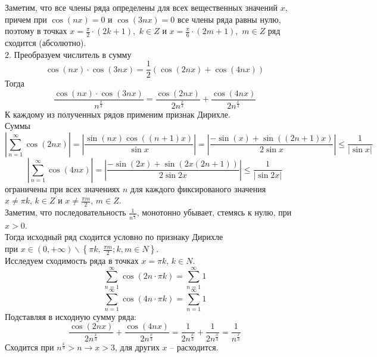 \documentclass[a5paper, 10pt]{article}
\theoremstyle{definition}
\theoremstyle{plain}
\theoremstyle{remark}
\begin{document}
Заметим, что все члены ряда определены для всех вещественных значений $x$, причем при $\cos(nx) = 0$  и $\cos(3 nx) = 0$  все члены ряда равны нулю, поэтому \hypertarget{pdf}{в точках}  $x = \frac{\pi}{2} \cdot (2k + 1), \,\, k \in Z$  и $x = \frac{\pi}{6} \cdot (2m + 1), \,\, m \in Z$ ряд сходится (абсолютно).\\
2. Преобразуем числитель в сумму
\begin{equation*}
\cos( nx) \cdot \cos (3nx) = \frac{1}{2}\left( \cos(2nx) + \cos(4nx) \right)
\end{equation*}
Тогда
\begin{equation*}
\frac{\cos( nx) \cdot \cos (3nx) }{n^{\frac{x}{3}}} = \frac{\cos( 2nx) }{2n^{\frac{x}{3}}}+\frac{ \cos (4nx) }{2n^{\frac{x}{3}}}
\end{equation*}
К каждому из полученных рядов применим признак Дирихле.\\
Суммы 
\begin{equation*}
\left| \sum \limits_{n = 1}^{\infty} \cos( 2nx) \right| = \left| \frac{\sin (n x) \cos((n+1)x)}{\sin x} \right| =
 \left| \frac{-\sin (x) +  \sin((2n+1)x)}{2\sin x} \right| \leq \frac{1}{ \left|\sin x\right|}
\end{equation*}
\begin{equation*}
\left| \sum \limits_{n = 1}^{\infty} \cos( 4nx) \right| = \left| \frac{-\sin (2x) +  \sin(2x(2n+1))}{2\sin 2x} \right| \leq \frac{1}{ \left|\sin 2x\right|}
\end{equation*}
ограничены при всех значениях $n$ для каждого фиксированого значения $x \neq \pi k, \, k \in Z$ и $x \neq \frac{\pi m}{2}, \, m \in Z$.\\
Заметим, что  последовательность $\frac{1}{n^{\frac{x}{3}}}$, монотонно убывает, стемясь к нулю, при $x > 0$. \\
Тогда исходный ряд сходится условно по признаку Дирихле\\
 при $x \in (0, + \infty) \backslash \left\{\pi k, \, \frac{\pi m}{2};  k, m \in N \right\} $. \\

Исследуем сходимость ряда в точках $x = \pi k, \, k \in N$.
\begin{equation*}
\sum \limits_{n = 1}^{\infty} \cos( 2n\cdot \pi k) = \sum \limits_{n = 1}^{\infty} 1 
\end{equation*}
\begin{equation*}
\sum \limits_{n = 1}^{\infty} \cos( 4n\cdot \pi k) = \sum \limits_{n = 1}^{\infty} 1 
\end{equation*}
Подставляя в исходную сумму ряда:
\begin{equation*}
 \frac{\cos( 2nx) }{2n^{\frac{x}{3}}}+\frac{ \cos (4nx) }{2n^{\frac{x}{3}}} = \frac{1 }{2n^{\frac{x}{3}}}+\frac{1 }{2n^{\frac{x}{3}}} = \frac{1 }{n^{\frac{x}{3}}}
\end{equation*}
Сходится при $n^{\frac{x}{3}} > n \to x > 3$, для других $x$ -- расходится.\\
\end{document}
